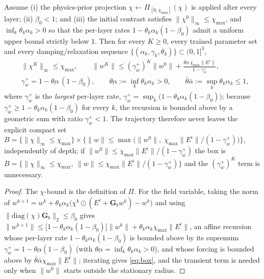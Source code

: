 \documentclass[journal,cmes,article,submit,moreauthors,pdftex]{Definitions/tsp}
\newcommand{\norm}[1]{\lVert #1 \rVert}
\newcommand{\infn}[1]{\lVert #1 \rVert_{\infty}}
\begin{document}
\begin{Theorem}\label{thm:bounded}
Assume (i) the physics-prior projection $\chi\leftarrow\Pi_{[0,\chi_{\max}]}(\chi)$ is applied after
every layer; (ii) $\beta_0<1$; and (iii) the initial contrast satisfies
$\infn{\chi^{0}}\le\chi_{\max}$, and $\inf_k\theta_k\alpha_k>0$ so that the per-layer rates $1-\theta_k\alpha_k(1-\beta_0)$ admit a uniform upper bound strictly below $1$. Then for every $K\ge0$, every trained parameter set and every
damping/relaxation sequence $\{(\alpha_k,\gamma_k,\theta_k)\}\subset(0,1]^{3}$,
\begin{equation}\label{eq:box}
\begin{aligned}
&\infn{\chi^{K}}\le\chi_{\max},\qquad
\norm{w^{K}}\le(\gamma_w^{+})^{K}\norm{w^{0}}
+\frac{\bar\theta\bar\alpha\,\chi_{\max}\norm{E^i}}{1-\gamma_w^{+}},\\
&\gamma_w^{+}=1-\underline{\theta\alpha}\,(1-\beta_0),\qquad
\underline{\theta\alpha}:=\inf_k\theta_k\alpha_k>0,\qquad
\bar\theta\bar\alpha:=\sup_k\theta_k\alpha_k\le1,
\end{aligned}
\end{equation}
where $\gamma_w^{+}$ is the \emph{largest} per-layer rate,
$\gamma_w^{+}=\sup_k\big(1-\theta_k\alpha_k(1-\beta_0)\big)$; because $\gamma_w^{+}\ge1-\theta_k\alpha_k(1-\beta_0)$ for every
$k$, the recursion is bounded above by a geometric sum with ratio $\gamma_w^{+}<1$. The trajectory
therefore never leaves the explicit compact set
$B=\{\infn{\chi}\le\chi_{\max}\}\times\{\norm{w}\le
\max\big(\norm{w^{0}},\;\chi_{\max}\norm{E^i}/(1-\gamma_w^{+})\big)\}$,
independently of depth; if $\norm{w^{0}}\le\chi_{\max}\norm{E^i}/(1-\gamma_w^{+})$ the box is
$B=\{\infn{\chi}\le\chi_{\max},\ \norm{w}\le\chi_{\max}\norm{E^i}/(1-\gamma_w^{+})\}$ and the
$(\gamma_w^{+})^{K}$ term is unnecessary.
\end{Theorem}
\begin{proof}
The $\chi$-bound is the definition of $\Pi$. For the field variable, taking the norm of
$w^{k+1}=w^{k}+\theta_k\alpha_k\big(\chi^{k}\odot(E^i+\mathbf{G}_b w^{k})-w^{k}\big)$ and using
$\norm{\mathrm{diag}(\chi)\mathbf{G}_b}_2\le\beta_0$ gives
$\norm{w^{k+1}}\le\big[1-\theta_k\alpha_k(1-\beta_0)\big]\norm{w^{k}}
+\theta_k\alpha_k\chi_{\max}\norm{E^i}$, an affine recursion whose per-layer rate
$1-\theta_k\alpha_k(1-\beta_0)$ is bounded above by its supremum
$\gamma_w^{+}=1-\underline{\theta\alpha}(1-\beta_0)$ (with $\underline{\theta\alpha}=\inf_k\theta_k\alpha_k>0$),
and whose forcing is bounded above by $\bar\theta\bar\alpha\chi_{\max}\norm{E^i}$; iterating gives
\eqref{eq:box}, and the transient term is needed only when $\norm{w^0}$ starts outside the stationary
radius.
\end{proof}
\end{document}
